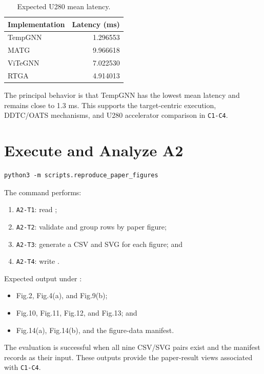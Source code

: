 \documentclass[conference]{IEEEtran}
\begin{document}
\begin{table}[h]
\caption{Expected U280 mean latency.}
\label{tab:ae-latency}
\centering
\begin{tabular}{lr}
\toprule
Implementation & Latency (ms) \\
\midrule
TempGNN & 1.296553 \\
MATG & 9.966618 \\
ViTeGNN & 7.022530 \\
RTGA & 4.914013 \\
\bottomrule
\end{tabular}
\end{table}

The principal behavior is that TempGNN has the lowest mean latency and remains
close to 1.3 ms. This supports the target-centric execution, DDTC/OATS
mechanisms, and U280 accelerator comparison in \texttt{C1-C4}.

\section{Execute and Analyze A2}

\begin{Verbatim}[fontsize=\small,breaklines=true,breakanywhere=true]
python3 -m scripts.reproduce_paper_figures
\end{Verbatim}

\noindent The command performs:
\begin{enumerate}
\item \texttt{A2-T1}: read ;
\item \texttt{A2-T2}: validate and group rows by paper figure;
\item \texttt{A2-T3}: generate a CSV and SVG for each figure; and
\item \texttt{A2-T4}: write .
\end{enumerate}

Expected output under :
\begin{itemize}
\item Fig.2, Fig.4(a), and Fig.9(b);
\item Fig.10, Fig.11, Fig.12, and Fig.13; and
\item Fig.14(a), Fig.14(b), and the figure-data manifest.
\end{itemize}

The evaluation is successful when all nine CSV/SVG pairs exist and the
manifest records  as their input. These outputs
provide the paper-result views associated with \texttt{C1-C4}.
\end{document}

